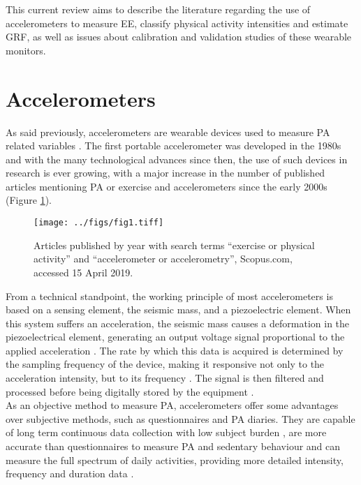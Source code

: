 \documentclass[11pt]{article}
\begin{document}
This current review aims to describe the literature regarding the use of accelerometers to measure EE, classify physical activity intensities and estimate GRF, as well as issues about calibration and validation studies of these wearable monitors. 

\section*{Accelerometers}

As said previously, accelerometers are wearable devices used to measure PA related variables \cite{Chen_2005}. The first portable accelerometer was developed in the 1980s \cite{Wong_1981, Montoye_1983} and with the many technological advances since then, the use of such devices in research is ever growing, with a major increase in the number of published articles mentioning PA or exercise and accelerometers since the early 2000s (Figure \ref{art_year}).

\begin{figure}[h!]
	\texttt{[image: ../figs/fig1.tiff]}
	\caption{Articles published by year with search terms ``exercise or physical activity'' and ``accelerometer or accelerometry'', Scopus.com, accessed 15 April 2019.}
	\label{art_year}
\end{figure}

From a technical standpoint, the working principle of most accelerometers is based on a sensing element, the seismic mass, and a piezoelectric element. When this system suffers an acceleration, the seismic mass causes a deformation in the piezoelectrical element, generating an output voltage signal proportional to the applied acceleration \cite{Chen_2005, Yang_2010}. The rate by which this data is acquired is determined by the sampling frequency of the device, making it responsive not only to the acceleration intensity, but to its frequency \cite{Mathie_2004}. The signal is then filtered and processed before being digitally stored by the equipment \cite{Chen_2005}. \\

As an objective method to measure PA, accelerometers offer some advantages over subjective methods, such as questionnaires and PA diaries. They are capable of long term continuous data collection with low subject burden \cite{Chen_2012, Strath_2013}, are more accurate than questionnaires to measure PA and sedentary behaviour \cite{Celis-Morales_2012, Matthews_2018} and can measure the full spectrum of daily activities, providing more detailed intensity, frequency and duration data \cite{Matthews_2018, Strath_2013}. \\
\end{document}
